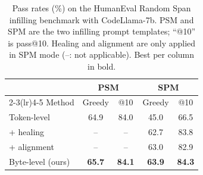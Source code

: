 \begin{table}[t]
\caption{Pass rates (\%) on the HumanEval Random Span infilling benchmark with CodeLlama-7b. PSM and SPM are the two infilling prompt templates; ``@10'' is pass@10. Healing and alignment are only applied in SPM mode (--: not applicable). Best per column in bold.}
\label{tab:fim}
\begin{center}
\begin{tabular}{lcccc}
\toprule
 & \multicolumn{2}{c}{PSM} & \multicolumn{2}{c}{SPM} \\
\cmidrule(lr){2-3}\cmidrule(lr){4-5}
Method & Greedy & @10 & Greedy & @10 \\
\midrule
Token-level & 64.9 & 84.0 & 45.0 & 66.5 \\
\quad + healing & -- & -- & 62.7 & 83.8 \\
\quad + alignment & -- & -- & 63.0 & 82.9 \\
\midrule
Byte-level (ours) & \textbf{65.7} & \textbf{84.1} & \textbf{63.9} & \textbf{84.3} \\
\bottomrule
\end{tabular}
\end{center}
\end{table}
